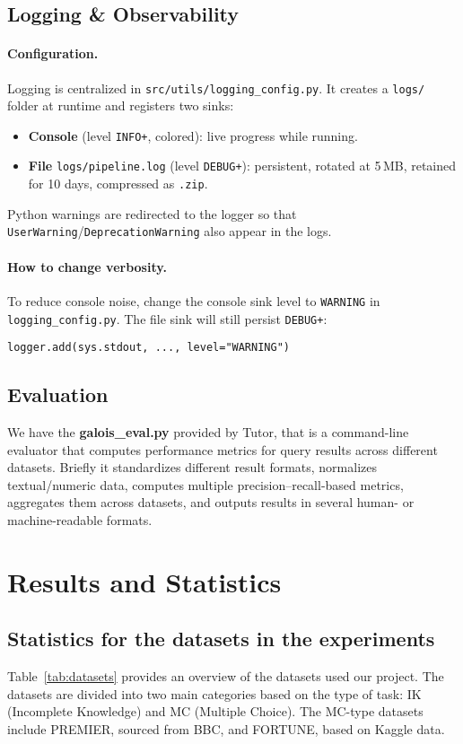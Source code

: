 \documentclass[12pt,a4paper]{article}
\begin{document}
\subsection{Logging \& Observability}
\label{subsec:logging-impl}

\paragraph{Configuration.}
Logging is centralized in \texttt{src/utils/logging\_config.py}. It creates a \texttt{logs/} folder at runtime and registers two sinks:
\begin{itemize}
  \item \textbf{Console} (level \texttt{INFO+}, colored): live progress while running.
  \item \textbf{File} \texttt{logs/pipeline.log} (level \texttt{DEBUG+}): persistent, rotated at 5\,MB, retained for 10 days, compressed as \texttt{.zip}.
\end{itemize}
Python warnings are redirected to the logger so that \texttt{UserWarning}/\texttt{DeprecationWarning} also appear in the logs.

\paragraph{How to change verbosity.}
To reduce console noise, change the console sink level to \texttt{WARNING} in
\texttt{logging\_config.py}. The file sink will still persist \texttt{DEBUG+}:
\begin{verbatim}
logger.add(sys.stdout, ..., level="WARNING")
\end{verbatim}

\subsection{Evaluation}
We have the \textbf{galois\_eval.py} provided by Tutor, that is a command-line evaluator that computes performance metrics for query results across different datasets.
Briefly it standardizes different result formats, normalizes textual/numeric data, computes multiple precision–recall-based metrics, aggregates them across datasets, and outputs results in several human- or machine-readable formats.

\section{Results and Statistics}
\subsection{Statistics for the datasets in the experiments}
Table~\ref{tab:datasets} provides an overview of the datasets used our project. The datasets are divided into two main categories based on the type of task: IK (Incomplete Knowledge) and MC (Multiple Choice).
The MC-type datasets include PREMIER, sourced from BBC, and FORTUNE, based on Kaggle data.
\end{document}
